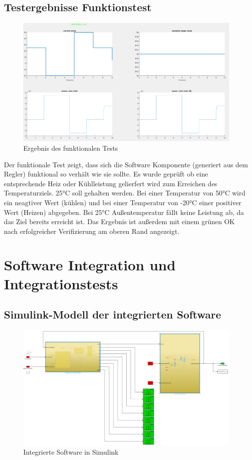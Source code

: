 \documentclass[a4paper,12pt]{article}
\begin{document}
\newpage

\subsection{Testergebnisse Funktionstest}
\begin{figure}[h!]
	\centering
	\includegraphics[width=\textwidth]{fct_test.png}
	\caption{Ergebnis des funktionalen Tests}
\end{figure}
Der funktionale Test zeigt, dass sich die Software Komponente (generiert aus dem Regler) funktional so verhält wie sie sollte. Es wurde geprüft ob eine entsprechende Heiz oder Kühlleistung gelierfert wird zum Erreichen des Temperaturziels. 25°C soll gehalten werden. Bei einer Temperatur von 50°C wird ein neagtiver Wert (kühlen) und bei einer Temperatur von -20°C einer positiver Wert (Heizen) abgegeben. Bei 25°C Außentemperatur fällt keine Leistung ab, da das Ziel bereits erreicht ist. Das Ergebnis ist außerdem mit einem grünen OK nach erfolgreicher Verifizierung am oberen Rand angezeigt. 
\newpage

\section{Software Integration und Integrationstests}
\subsection{Simulink-Modell der integrierten Software}
\begin{figure}[h!]
	\centering
	\includegraphics[width=\textwidth]{sw_integration.png}
	\caption{Integrierte Software in Simulink}
\end{figure}
\end{document}
